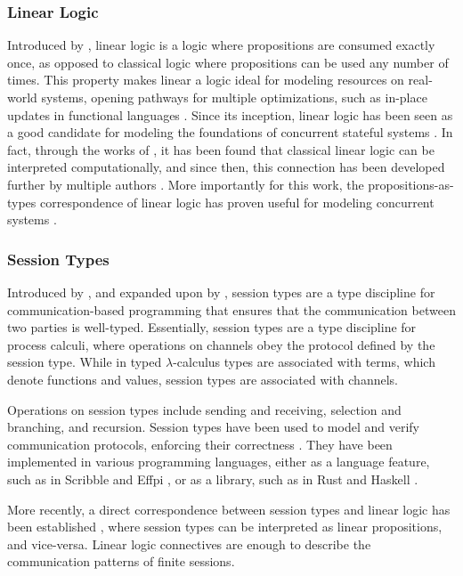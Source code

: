 \documentclass[sigconf,nonacm,natbib=true]{acmart}
\begin{document}
\subsubsection{Linear Logic}

Introduced by \citet{Girard:1987}, linear logic is a logic where propositions are consumed exactly once, as opposed to classical logic where propositions can be used any number of times. This property makes linear a logic ideal for modeling resources on real-world systems, opening pathways for multiple optimizations, such as in-place updates in functional languages \citep{Hofmann:2000}. Since its inception, linear logic has been seen as a good candidate for modeling the foundations of concurrent stateful systems \citep{Wadler:1990}. In fact, through the works of \citet{Abramsky:1993}, it has been found that classical linear logic can be interpreted computationally, and since then, this connection has been developed further by multiple authors \citep{Turner:1999}. More importantly for this work, the propositions-as-types correspondence of linear logic has proven useful for modeling concurrent systems \cite{Caires:2010}.

\subsubsection{Session Types}

Introduced by \citet{Honda:1993}, and expanded upon by \citet{Honda:1998}, session types are a type discipline for communication-based programming that ensures that the communication between two parties is well-typed. Essentially, session types are a type discipline for process calculi, where operations on channels obey the protocol defined by the session type. While in typed $\lambda$-calculus types are associated with terms, which denote functions and values, session types are associated with channels.

Operations on session types include sending and receiving, selection and branching, and recursion. Session types have been used to model and verify communication protocols, enforcing their correctness \citep{Huttel:2016}. They have been implemented in various programming languages, either as a language feature, such as in Scribble \citep{Yoshida:2014} and Effpi \citep{Scalas:2019}, or as a library, such as in Rust \citep{Jespersen:2015} and Haskell \citep{Pucella:2008}.

More recently, a direct correspondence between session types and linear logic has been established \citep{Caires:2010, Wadler:2012, Caires:2012, Caires:2016, Giunti:2016}, where session types can be interpreted as linear propositions, and vice-versa. Linear logic connectives are enough to describe the communication patterns of finite sessions.
\end{document}
